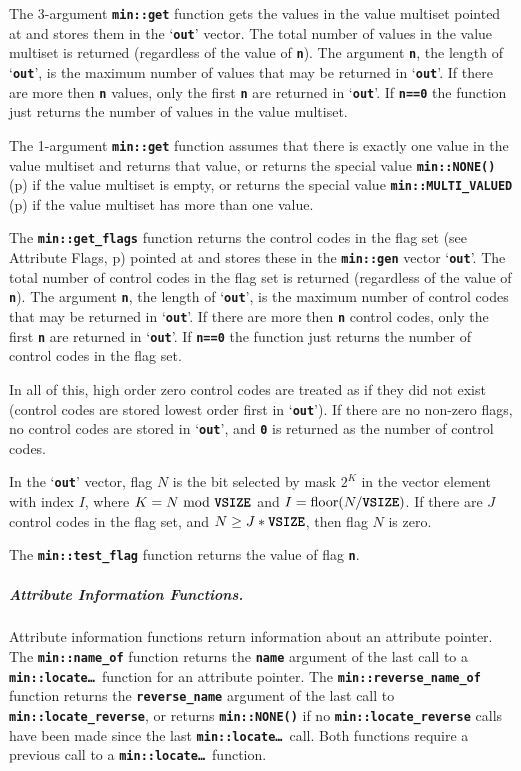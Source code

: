 \documentclass[12pt]{article}
\newcommand{\subsubsubsubsection}[1]{\subparagraph[#1]{#1.}}
\newcommand{\TT}[1]{{\tt \bfseries #1}}
\newcommand{\pagref}[1]{p\pageref{#1}}
\newcommand{\EOL}{\penalty \exhyphenpenalty}
\begin{document}
The 3-argument \TT{min::\EOL get} function gets the values in the value
multiset pointed at and stores them in the `\TT{out}' vector.
The total number of values in the value
multiset is returned (regardless of the value of \TT{n}).
The argument \TT{n}, the length of `\TT{out}',
is the maximum number of values that may be returned in `\TT{out}'.
If there are more then \TT{n} values, only the first \TT{n}
are returned in `\TT{out}'.
If \TT{n==0} the function just returns
the number of values in the value multiset.

The 1-argument \TT{min::\EOL get} function assumes that there is exactly
one value in the value multiset
and returns that value, or returns the special value
\TT{min::NONE()} (\pagref{MIN::NONE}) if the value multiset is empty,
or returns the special value
\TT{min::MULTI\_VALUED} (\pagref{MIN::MULTI_VALUED}) if the value multiset
has more than one value.

The \TT{min::\EOL get\_\EOL flags}
function returns the control codes in the flag set
(see Attribute Flags, \pagref{ATTRIBUTE-FLAGS}) pointed at and stores
these in the \TT{min::gen} vector `\TT{out}'.
The total number of control codes in the flag set is returned
(regardless of the value of \TT{n}).
The argument \TT{n}, the length of `\TT{out}',
is the maximum number of control codes that may be returned in `\TT{out}'.
If there are more then \TT{n} control codes, only the first \TT{n}
are returned in `\TT{out}'.
If \TT{n==0} the function just returns
the number of control codes in the flag set.

In all of this, high order zero control codes are treated as if
they did not exist (control codes are stored lowest order first
in `\TT{out}').  If there are no non-zero flags, no control codes
are stored in `\TT{out}', and \TT{0} is returned as the number of
control codes.

In the `\TT{out}' vector, flag $N$ is the bit selected by mask $2^K$
in the vector element with index $I$, where $K=N~\mbox{mod}~\mbox{\TT{VSIZE}}$
and $I=\mbox{floor}(N/\mbox{\TT{VSIZE}})$.
If there are $J$ control codes
in the flag set, and $N\geq J*\mbox{\TT{VSIZE}}$, then
flag $N$ is zero.

The \TT{min::\EOL test\_\EOL flag} function returns the value
of flag \TT{n}.

\subsubsubsubsection{Attribute Information Functions}
\label{ATTRIBUTE-INFORMATION-FUNCTIONS}

Attribute information functions
return information about an attribute pointer.
The \TT{min::\EOL name\_\EOL of} function returns the \TT{name}
argument of the last call to a \TT{min::\EOL locate\ldots}~function
for an attribute pointer.
The \TT{min::\EOL reverse\_\EOL name\_\EOL of} function
returns the \TT{reverse\_\EOL name} argument of the last call to
\TT{min::\EOL locate\_\EOL reverse},
or returns \TT{min::\EOL NONE()} if no
\TT{min::\EOL locate\_\EOL reverse} calls have been made
since the last \TT{min::\EOL locate\ldots}~call.  Both functions
require a previous call to a \TT{min::\EOL locate\ldots}~function.
\end{document}
